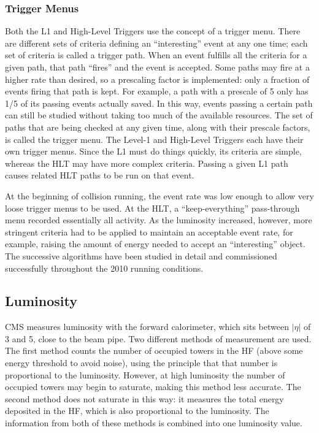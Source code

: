 \subsubsection{Trigger Menus}
\label{exp:trigMenus}
Both the L1 and High-Level Triggers use the concept of a trigger menu.  
There are different sets of criteria defining an ``interesting'' event 
at any one time;  
each set of criteria is called a trigger path.  
When an event fulfills all the criteria for a given path, 
that path ``fires'' and the event is accepted.  
Some paths may fire at a higher rate than desired, 
so a prescaling factor is implemented: 
only a fraction of events firing that path is kept.  
For example, a path with a prescale of 5 only 
has 1/5 of its passing events actually saved.  
In this way, events passing a certain path can still 
be studied without taking too much of the available resources.  
The set of paths that are being checked at any given time,
along with their prescale factors,  
is called the trigger menu.  
The Level-1 and High-Level Triggers each have their own 
trigger menus.  
Since the L1 must do things quickly, 
its criteria are simple, 
whereas the HLT may have more complex criteria.  
Passing a given L1 path causes 
related HLT paths to be run on that event.  

At the beginning of collision running, 
the event rate was low enough to allow very loose trigger 
menus to be used.  
At the HLT, a ``keep-everything'' pass-through menu 
recorded essentially all activity.  
As the luminosity increased, however, more stringent criteria had 
to be applied to maintain an acceptable event rate, 
for example, raising the amount of energy needed to accept an 
``interesting'' object.  
The successive algorithms have been studied in detail and 
commissioned successfully throughout the 2010 running conditions.  

\subsection{Luminosity}
\label{exp:lumi}

CMS measures luminosity with the forward calorimeter, which sits 
between $|\eta|$ of 3 and 5, close to the beam pipe.  
Two different methods of measurement are used.  
The first method counts the number of occupied towers in the HF 
(above some energy threshold to avoid noise), 
using the principle that that number is proportional to the luminosity.  
However, at high luminosity the number of occupied towers may begin to 
saturate, making this method less accurate.  
The second method does not saturate in this way: 
it measures the total energy deposited in the HF, 
which is also proportional to the luminosity.  
The information from both of these methods is combined into one 
luminosity value.  

